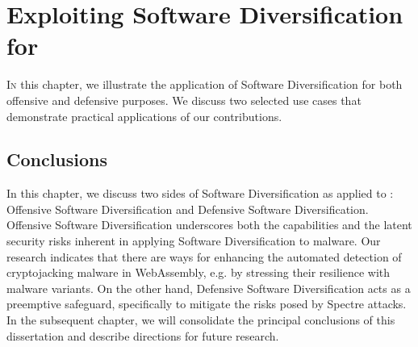 \chapter{Exploiting Software Diversification for \Wasm}
\label{exploit}
\lettrine[lines=4]{I}{n} this chapter, we illustrate the application of Software Diversification for both offensive and defensive purposes.
We discuss two selected use cases that demonstrate practical applications of our contributions.








% 

\section*{Conclusions}

In this chapter, we discuss two sides of Software Diversification as applied to \Wasm: Offensive Software Diversification and Defensive Software Diversification.
Offensive Software Diversification underscores both the capabilities and the latent security risks inherent in applying Software Diversification to \Wasm malware.
Our research indicates that there are ways for enhancing the automated detection of cryptojacking malware in WebAssembly, e.g. by stressing their resilience with \Wasm malware variants.
On the other hand, Defensive Software Diversification acts as a preemptive safeguard, specifically to mitigate the risks posed by Spectre attacks.
In the subsequent chapter, we will consolidate the principal conclusions of this dissertation and describe directions for future research.
